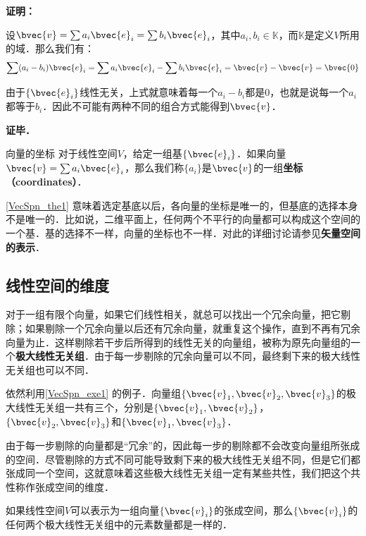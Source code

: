 \textbf{证明：}

设$\bvec{v}=\sum a_i\bvec{e}_i=\sum b_i\bvec{e}_i$，其中$a_i, b_i\in \mathbb{K}$，而$\mathbb{K}$是定义$V$所用的域．那么我们有：
\begin{equation}
\sum(a_i-b_i)\bvec{e}_i=\sum a_i\bvec{e}_i-\sum b_i\bvec{e}_i=\bvec{v}-\bvec{v}=\bvec{0}
\end{equation}

由于$\{\bvec{e}_i\}$线性无关，上式就意味着每一个$a_i-b_i$都是$0$，也就是说每一个$a_i$都等于$b_i$．因此不可能有两种不同的组合方式能得到$\bvec{v}$．

\textbf{证毕．}

\begin{definition}{向量的坐标}
对于线性空间$V$，给定一组基$\{\bvec{e}_i\}$．如果向量$\bvec{v}=\sum a_i\bvec{e}_i$，那么我们称$\{a_i\}$是$\bvec{v}$的一组\textbf{坐标（coordinates）}．
\end{definition}

\autoref{VecSpn_the1} 意味着选定基底以后，各向量的坐标是唯一的，但基底的选择本身不是唯一的．比如说，二维平面上，任何两个不平行的向量都可以构成这个空间的一个基．基的选择不一样，向量的坐标也不一样．对此的详细讨论请参见\textbf{矢量空间的表示}．

\subsection{线性空间的维度}

对于一组有限个向量，如果它们线性相关，就总可以找出一个冗余向量，把它剔除；如果剔除一个冗余向量以后还有冗余向量，就重复这个操作，直到不再有冗余向量为止．这样剔除若干步后所得到的线性无关的向量组，被称为原先向量组的一个\textbf{极大线性无关组}．由于每一步剔除的冗余向量可以不同，最终剩下来的极大线性无关组也可以不同．

\begin{example}{}
依然利用\autoref{VecSpn_exe1} 的例子．向量组$\{\bvec{v}_1, \bvec{v}_2, \bvec{v}_3\}$的极大线性无关组一共有三个，分别是$\{\bvec{v}_1, \bvec{v}_2\}$，$\{\bvec{v}_2, \bvec{v}_3\}$和$\{\bvec{v}_1, \bvec{v}_3\}$．
\end{example}

由于每一步剔除的向量都是“冗余”的，因此每一步的剔除都不会改变向量组所张成的空间．尽管剔除的方式不同可能导致剩下来的极大线性无关组不同，但是它们都张成同一个空间，这就意味着这些极大线性无关组一定有某些共性，我们把这个共性称作张成空间的维度．

\begin{theorem}{}\label{VecSpn_the2}
如果线性空间$V$可以表示为一组向量$\{\bvec{v}_i\}$的张成空间，那么$\{\bvec{v}_i\}$的任何两个极大线性无关组中的元素数量都是一样的．
\end{theorem}

